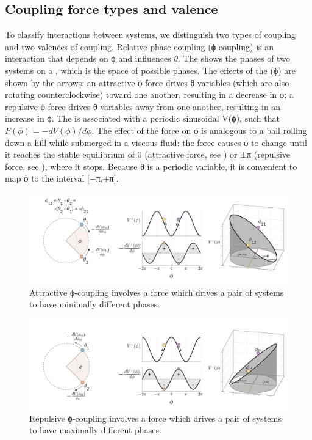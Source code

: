 \subsection{Coupling force types and valence} 

To classify interactions between systems, we distinguish two types of coupling and two valences of coupling. Relative phase coupling (ϕ-coupling) is an interaction that depends on  ϕ and influences $\dot{θ}$. The {} shows the phases of two systems on a , which is the space of possible phases. The effects of the  (ϕ)  are shown by the arrows: an attractive ϕ-force drives θ variables (which are also rotating counterclockwise) toward one another, resulting in a decrease in ϕ; a repulsive ϕ-force drives θ variables away from one another, resulting in an increase in ϕ. The  is associated with a periodic sinusoidal  V(ϕ), such that  $F(\phi)=-dV(\phi)/d\phi$. The effect of the force on ϕ is analogous to a ball rolling down a hill while submerged in a viscous fluid: the force causes ϕ to change until it reaches the stable equilibrium of 0 (attractive force, see {}) or ±π (repulsive force, see {}), where it stops. Because θ is a periodic variable, it is convenient to map ϕ to the interval [−π,+π]. 

  
\begin{figure}
\includegraphics[width=\textwidth]{figures/Tilsen-img18.png}
\caption{Attractive ϕ-coupling involves a force which drives a pair of systems to have minimally different phases.}
\label{fig:2:11}
\end{figure}
 

  
\begin{figure}
\includegraphics[width=\textwidth]{figures/Tilsen-img19.png}
\caption{Repulsive ϕ-coupling involves a force which drives a pair of systems to have maximally different phases.}
\label{fig:2:12}
\end{figure}
 

